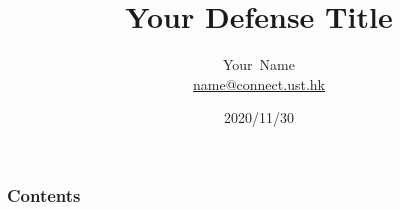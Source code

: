 \documentclass[handout, aspectratio=1610, 14pt]{beamer}
\begin{document}
\title{Your Defense Title}
\author{\texorpdfstring{Your~Name\\{\scriptsize \url{name@connect.ust.hk}}}{Your~Name}}
\date{2020/11/30}

\frame{\titlepage}

\begin{frame}
\frametitle{Contents}
\makecontents
\end{frame}













\begin{frame}
\thanks
\end{frame}
\end{document}
